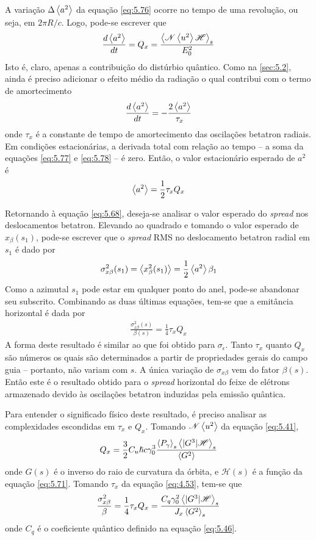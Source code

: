 A variação $\Delta \left< a^2 \right>$ da equação \eqref{eq:5.76} ocorre no tempo de uma revolução, ou seja, em $2 \pi R/c$. Logo, pode-se escrever que
\begin{align}
	\frac{d\left< a^2 \right>}{dt} = Q_x = \frac{\left< \mathscr{N}\left< u^2 \right>\mathscr{H} \right>_s}{E_0^2}\label{eq:5.77}
\end{align}
Isto é, claro, apenas a contribuição do distúrbio quântico. Como na \autoref{sec:5.2}, ainda é preciso adicionar o efeito médio da radiação o qual contribui com o termo de amortecimento
\begin{align}
	\frac{d\left< a^2 \right>}{dt} = - \frac{2\left< a^2 \right>}{\tau_x}\label{eq:5.78}
\end{align}
onde $\tau_x$ é a constante de tempo de amortecimento das oscilações betatron radiais. Em condições estacionárias, a derivada total com relação ao tempo -- a soma da equações \eqref{eq:5.77} e \eqref{eq:5.78} -- é zero. Então, o valor estacionário esperado de $a^2$ é
\begin{align}
	\left< a^2 \right> = \frac{1}{2}\tau_x Q_x
\end{align}

Retornando à equação \eqref{eq:5.68}, deseja-se analisar o valor esperado do \textit{spread} nos deslocamentos betatron. Elevando ao quadrado e tomando o valor esperado de $x_\beta(s_1)$, pode-se escrever que o \textit{spread} RMS no deslocamento betatron radial em $s_1$ é dado por
\begin{align}
	\sigma_{x\beta}^2(s_1) = \left< x_\beta^2(s_1) \right> = \frac{1}{2} \left< a^2 \right>\beta_1
\end{align}
Como a azimutal $s_1$ pode estar em qualquer ponto do anel, pode-se abandonar seu subscrito. Combinando as duas últimas equações, tem-se que a emitância horizontal é dada por
\begin{align}
	\frac{\sigma_{x\beta}^2(s)}{\beta(s)} = \frac{1}{4}\tau_x Q_x \label{eq:5.81}
\end{align}
A forma deste resultado é similar ao que foi obtido para $\sigma_\epsilon$. Tanto $\tau_x$ quanto $Q_x$ são números os quais são determinados a partir de propriedades gerais do campo guia -- portanto, não variam com $s$. A única variação de $\sigma_{x\beta}$ vem do fator $\beta(s)$. Então este é o resultado obtido para o \textit{spread} horizontal do feixe de elétrons armazenado devido às oscilações betatron induzidas pela emissão quântica.

Para entender o significado físico deste resultado, é preciso analisar as complexidades escondidas em $\tau_x$ e $Q_x$. Tomando $\mathscr{N}\left< u^2 \right>$ da equação \eqref{eq:5.41},
\begin{align}
	Q_x = \frac{3}{2} C_u \hslash c \gamma_0^3 \frac{\left< P_\gamma \right>_s \left< |G^3| \mathscr{H} \right>_s}{\left< G^2 \right>}
\end{align}
onde $G(s)$ é o inverso do raio de curvatura da órbita, e $\mathscr{H}(s)$ é a função da equação \eqref{eq:5.71}. Tomando $\tau_x$ da equação \eqref{eq:4.53}, tem-se que
\begin{align}
	\frac{\sigma_{x\beta}^2}{\beta} = \frac{1}{4}\tau_x Q_x = \frac{C_q \gamma_0^2\left< |G^3| \mathscr{H} \right>_s}{J_x \left< G^2 \right>_s}
\end{align}
onde $C_q$ é o coeficiente quântico definido na equação \eqref{eq:5.46}.


